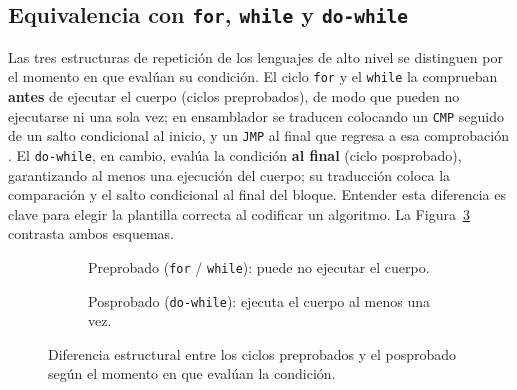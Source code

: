 \documentclass[a4paper,12pt]{article}
\begin{document}
\subsection{Equivalencia con \texttt{for}, \texttt{while} y \texttt{do-while}}
Las tres estructuras de repetición de los lenguajes de alto nivel se distinguen por el momento en que evalúan su condición. El ciclo \texttt{for} y el \texttt{while} la comprueban \textbf{antes} de ejecutar el cuerpo (ciclos preprobados), de modo que pueden no ejecutarse ni una sola vez; en ensamblador se traducen colocando un \texttt{CMP} seguido de un salto condicional al inicio, y un \texttt{JMP} al final que regresa a esa comprobación \cite{patterson2016computer}. El \texttt{do-while}, en cambio, evalúa la condición \textbf{al final} (ciclo posprobado), garantizando al menos una ejecución del cuerpo; su traducción coloca la comparación y el salto condicional al final del bloque. Entender esta diferencia es clave para elegir la plantilla correcta al codificar un algoritmo. La Figura~\ref{fig:pre_pos} contrasta ambos esquemas.

\begin{figure}[H]
\centering
\begin{subfigure}[t]{0.48\textwidth}
\centering
{}
\caption{Preprobado (\texttt{for} / \texttt{while}): puede no ejecutar el cuerpo.}
\label{fig:preprobado}
\end{subfigure}
\hfill
\begin{subfigure}[t]{0.48\textwidth}
\centering
{}
\caption{Posprobado (\texttt{do-while}): ejecuta el cuerpo al menos una vez.}
\label{fig:posprobado}
\end{subfigure}
\caption{Diferencia estructural entre los ciclos preprobados y el posprobado según el momento en que evalúan la condición.}
\label{fig:pre_pos}
\end{figure}
\end{document}
